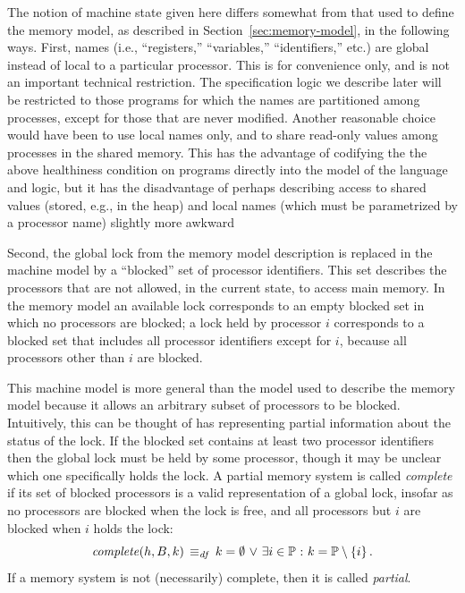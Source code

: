 \documentclass[11pt]{report}
\begin{document}
The notion of machine state given here differs somewhat from that used to define the memory model, as described in Section~\ref{sec:memory-model}, in the following ways. First, names (i.e., ``registers,'' ``variables,'' ``identifiers,'' etc.) are global instead of local to a particular processor. This is for convenience only, and is not an important technical restriction. The specification logic we describe later will be restricted to those programs for which the names are partitioned among processes, except for those that are never modified. Another reasonable choice would have been to use local names only, and to share read-only values among processes in the shared memory. This has the advantage of codifying the the above healthiness condition on programs directly into the model of the language and logic, but it has the disadvantage of perhaps describing access to shared values (stored, e.g., in the heap) and local names (which must be parametrized by a processor name) slightly more awkward

Second, the global lock from the memory model description is replaced in the machine model by a ``blocked'' set of processor identifiers. This set describes the processors that are not allowed, in the current state, to access main memory. In the memory model an available lock corresponds to an empty blocked set in which no processors are blocked; a lock held by processor $i$ corresponds to a blocked set that includes all processor identifiers except for $i$, because all processors other than $i$ are blocked. 

This machine model is more general than the model used to describe the memory model because it allows an arbitrary subset of processors to be blocked. Intuitively, this can be thought of has representing partial information about the status of the lock. If the blocked set contains at least two processor identifiers then the global lock must be held by some processor, though it may be unclear which one specifically holds the lock. A partial memory system is called \emph{complete} if its set of blocked processors is a valid representation of a global lock, insofar as no processors are blocked when the lock is free, and all processors but $i$ are blocked when $i$ holds the lock: \[ \mathit{complete}(h,B,k) \operatorname{\;\equiv_{\mathit{df}}\;} k = \operatorname{\emptyset} \operatorname{\,\vee\,} \exists i \in \mathbb{P} \operatorname{\,:\,} k = \mathbb{P} \setminus \left\lbrace i \right\rbrace.\] If a memory system is not (necessarily) complete, then it is called \emph{partial}.
\end{document}
